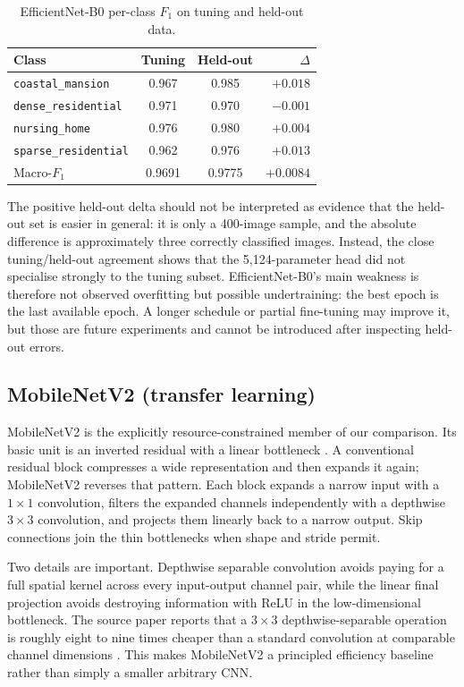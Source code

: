 \documentclass[11pt,twoside,a4paper]{article}
\begin{document}
\begin{table}[H]
\centering
\caption{EfficientNet-B0 per-class $F_1$ on tuning and held-out data.}
\label{tab:efficientnet-bias}
\small
\begin{tabular}{lccr}
\toprule
Class & Tuning & Held-out & $\Delta$ \\
\midrule
\texttt{coastal\_mansion}    & 0.967 & 0.985 & $+0.018$ \\
\texttt{dense\_residential}  & 0.971 & 0.970 & $-0.001$ \\
\texttt{nursing\_home}       & 0.976 & 0.980 & $+0.004$ \\
\texttt{sparse\_residential} & 0.962 & 0.976 & $+0.013$ \\
\midrule
Macro-$F_1$ & 0.9691 & 0.9775 & $+0.0084$ \\
\bottomrule
\end{tabular}
\end{table}

The positive held-out delta should not be interpreted as evidence that the
held-out set is easier in general: it is only a 400-image sample, and the
absolute difference is approximately three correctly classified images.
Instead, the close tuning/held-out agreement shows that the 5,124-parameter
head did not specialise strongly to the tuning subset. EfficientNet-B0's main
weakness is therefore not observed overfitting but possible undertraining: the
best epoch is the last available epoch. A longer schedule or partial
fine-tuning may improve it, but those are future experiments and cannot be
introduced after inspecting held-out errors.

\subsection{MobileNetV2 (transfer learning)}
\label{sec:mobilenet}

MobileNetV2 is the explicitly resource-constrained member of our comparison.
Its basic unit is an inverted residual with a linear bottleneck
\cite{Sandler2018}. A conventional residual block compresses a wide
representation and then expands it again; MobileNetV2 reverses that pattern.
Each block expands a narrow input with a $1\times1$ convolution, filters the
expanded channels independently with a depthwise $3\times3$ convolution, and
projects them linearly back to a narrow output. Skip connections join the thin
bottlenecks when shape and stride permit.

Two details are important. Depthwise separable convolution avoids paying for a
full spatial kernel across every input-output channel pair, while the linear
final projection avoids destroying information with ReLU in the
low-dimensional bottleneck. The source paper reports that a $3\times3$
depthwise-separable operation is roughly eight to nine times cheaper than a
standard convolution at comparable channel dimensions \cite{Sandler2018}.
This makes MobileNetV2 a principled efficiency baseline rather than simply a
smaller arbitrary CNN.
\end{document}

